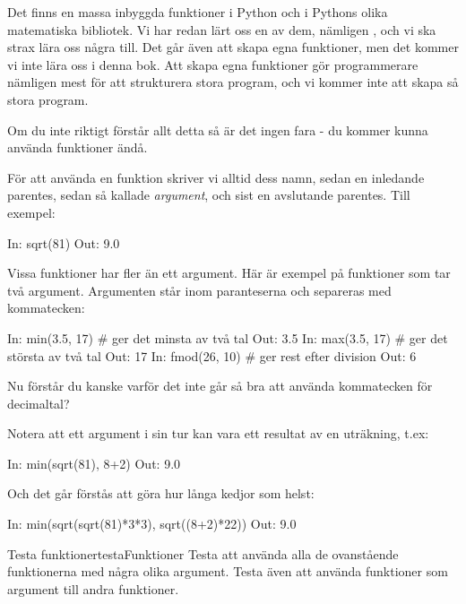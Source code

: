 Det finns en massa inbyggda funktioner i Python och i Pythons olika matematiska bibliotek. Vi har redan lärt oss en av dem, nämligen , och vi ska strax lära oss några till. Det går även att skapa egna funktioner, men det kommer vi inte lära oss i denna bok. Att skapa egna funktioner gör programmerare nämligen mest för att strukturera stora program, och vi kommer inte att skapa så stora program.

Om du inte riktigt förstår allt detta så är det ingen fara - du kommer kunna använda funktioner ändå.

För att använda en funktion skriver vi alltid dess namn, sedan en inledande parentes, sedan så kallade \emph{argument}, och sist en avslutande parentes. Till exempel:

\begin{python}[caption={Repetition av funktionsanvändning},label={}]
In: sqrt(81)
Out: 9.0
\end{python}

Vissa funktioner har fler än ett argument. Här är exempel på funktioner som tar två argument. Argumenten står inom paranteserna och separeras med kommatecken: 
\begin{python}[caption={Funktioner med två argument},label={ex:funktionermedtvaargument}]
In: min(3.5, 17) # ger det minsta av två tal
Out: 3.5
In: max(3.5, 17) # ger det största av två tal
Out: 17
In: fmod(26, 10) # ger rest efter division
Out: 6
\end{python}

Nu förstår du kanske varför det inte går så bra att använda kommatecken för decimaltal?

Notera att ett argument i sin tur kan vara ett resultat av en uträkning, t.ex:

\begin{python}[caption={Resultat av uträkning som argument},label={}]
In: min(sqrt(81), 8+2)
Out: 9.0	
\end{python}

Och det går förstås att göra hur långa kedjor som helst:

\begin{python}[caption={Människor från yttre rymden},label={}]
In: min(sqrt(sqrt(81)*3*3), sqrt((8+2)*22))
Out: 9.0
\end{python}

\begin{matteovning}{Testa funktioner}{testaFunktioner}
Testa att använda alla de ovanstående funktionerna med några olika argument. Testa även att använda funktioner som argument till andra funktioner.
\end{matteovning}


